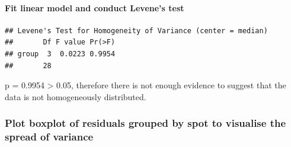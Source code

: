 \documentclass[
]{article}
\newenvironment{Shaded}{\begin{snugshade}}{\end{snugshade}}
\newcommand{\AttributeTok}[1]{\textcolor[rgb]{0.13,0.29,0.53}{#1}}
\newcommand{\FunctionTok}[1]{\textcolor[rgb]{0.13,0.29,0.53}{\textbf{#1}}}
\newcommand{\NormalTok}[1]{#1}
\newcommand{\OtherTok}[1]{\textcolor[rgb]{0.56,0.35,0.01}{#1}}
\newcommand{\SpecialCharTok}[1]{\textcolor[rgb]{0.81,0.36,0.00}{\textbf{#1}}}
\newcommand{\StringTok}[1]{\textcolor[rgb]{0.31,0.60,0.02}{#1}}
\begin{document}
\paragraph{Fit linear model and conduct Levene's
test}\label{fit-linear-model-and-conduct-levenes-test-1}

\begin{Shaded}
\end{Shaded}

\begin{verbatim}
## Levene's Test for Homogeneity of Variance (center = median)
##       Df F value Pr(>F)
## group  3  0.0223 0.9954
##       28
\end{verbatim}

p = 0.9954 \textgreater{} 0.05, therefore there is not enough evidence
to suggest that the data is not homogeneously distributed.

\subsubsection{Plot boxplot of residuals grouped by spot to visualise
the spread of
variance}\label{plot-boxplot-of-residuals-grouped-by-spot-to-visualise-the-spread-of-variance}

\begin{Shaded}
\end{Shaded}
\end{document}
